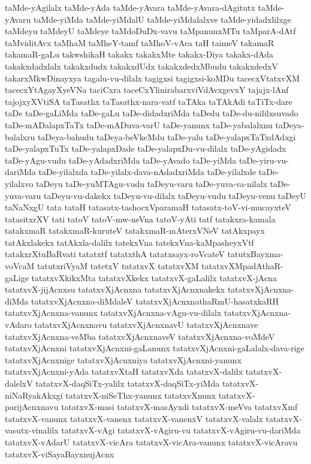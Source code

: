 {taMde-yAgilalx
taMde-yAda
taMde-yAvara
taMde-yAvara-dAgitutx
taMde-yAvaru
taMde-yiMda
taMde-yiMdalU
taMde-yiMdalalxve
taMde-yidadxlilxge
taMdeyu
taMdeyU
taMdeye
taMdoDuDx-vavu
taMpanunxMTu
taMparA-dAtf
taMviditAvx
taMhaM
taMheY-tamf
taMhoV-vAca
taH
taimeV
takamaR
takamaR-gaLu
takwshikaH
takakx
takakxMte
takakx-Diya
takakx-dAda
takakxdadxlalx
takakxdudx
takakxdUdx
takakxdedxMbudu
takakxdedxV
takarxMkwDinayxya
tagalu-vu-dilalx
tagigxsi
tagigxsi-koMDu
tacecxVtatxvXM
tacecxYtAgayXyeVNa
taciCxra
taceCxYlinirabarxviVdAvxgevxY
tajajx-lAnf
tajojxyXVtiSA
taTasathx
taTasathx-nara-vatf
taTAka
taTAkAdi
taTiTx-dare
taDe
taDe-gaLiMda
taDe-gaLu
taDe-didadxriMda
taDedu
taDe-du-nililxsuvado
taDe-mADalapxTaTx
taDe-mADuva-varU
taDe-yanunx
taDe-yabalalxnu
taDeya-balalxru
taDeya-bahudu
taDeya-beVkeMdu
taDe-yalu
taDe-yalapxTaTxdAdxgi
taDe-yalapxTuTx
taDe-yalapxDade
taDe-yalapxDu-vu-dilalx
taDe-yAgidadx
taDe-yAgu-vudu
taDe-yAdadxriMda
taDe-yAvado
taDe-yiMda
taDe-yiru-vu-dariMda
taDe-yilalxda
taDe-yilalx-dava-nAdadxriMda
taDe-yilalxde
taDe-yilalxvo
taDeyu
taDe-yuMTAgu-vudu
taDeyu-varu
taDe-yuva-va-nilalx
taDe-yuva-varu
taDeyu-vu-dakekx
taDeyu-vu-dilalx
taDeyu-vudu
taDeyu-venu
taDeyU
taNaNxgU
tata
tataH
tatasatx-tashocxVparamaH
tatasatx-toV-vi-mucayxteV
tatasitxrXV
tati
tatoV
tatoV-mw-neVna
tatoV-yAti
tatf
tatakxra-kamala
tatakxmaR
tatakxmaR-kuruteV
tatakxmaR-mAterxVNeV
tatAkxpayx
tatAkxlakekx
tatAkxla-dalilx
tatekxVna
tatekxVna-kaMpasheyxVtf
tatakxrXtuBaRvati
tatatxtf
tatatxthA
tatatxsayx-roVcateV
tatutxBayxma-voVcaM
tatutxriVyaM
tatetxV
tatatxvX
tatatxvXM
tatatxvXMpadAthaR-gaLige
tatatxvXkikxMta
tatatxvXkekx
tatatxvX-gaLalilx
tatatxvX-jAcna
tatatxvX-jijAcnxsu
tatatxvXjAcnxna
tatatxvXjAcnxnakekx
tatatxvXjAcnxna-diMda
tatatxvXjAcnxna-diMdaleV
tatatxvXjAcnxnathaRmU-hasatxkaRH
tatatxvXjAcnxna-vanunx
tatatxvXjAcnxna-vAgu-vu-dilalx
tatatxvXjAcnxna-vAdaro
tatatxvXjAcnxnavu
tatatxvXjAcnxnavU
tatatxvXjAcnxnave
tatatxvXjAcnxna-veMba
tatatxvXjAcnxnaveV
tatatxvXjAcnxna-voMdeV
tatatxvXjAcnxni
tatatxvXjAcnxni-gaLanunx
tatatxvXjAcnxni-gaLalalx-dava-rige
tatatxvXjAcnxnige
tatatxvXjAcnxniya
tatatxvXjAcnxni-yanunx
tatatxvXjAcnxni-yAda
tatatxvXtaH
tatatxvXda
tatatxvX-dalilx
tatatxvX-dalelxV
tatatxvX-daqSiTx-yalilx
tatatxvX-daqSiTx-yiMda
tatatxvX-niNaRyakAkxgi
tatatxvX-niSeThx-yanunx
tatatxvXnunx
tatatxvX-parijAcnxnavu
tatatxvX-masi
tatatxvX-masAyxdi
tatatxvX-meVva
tatatxvXmf
tatatxvX-vanunx
tatatxvX-vanenx
tatatxvX-vanenxV
tatatxvX-valalx
tatatxvX-vasutx-vinalilx
tatatxvX-vAgi
tatatxvX-vAgiru-vu
tatatxvX-vAgiru-vu-dariMda
tatatxvX-vAdarU
tatatxvX-vicAra
tatatxvX-vicAra-vanunx
tatatxvX-vicAravu
tatatxvX-viSayaBayxnujAcnx
}
